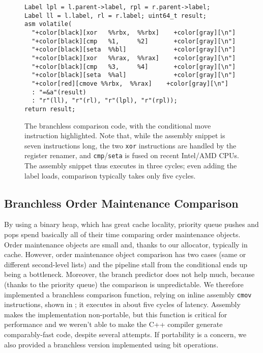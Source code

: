 \begin{figure}
\begin{Verbatim}[formatcom=\color{gray}, commandchars={+[]}]
Label lpl = l.parent->label, rpl = r.parent->label;
Label ll = l.label, rl = r.label; uint64_t result;
asm volatile(
  "+color[black][xor   %%rbx,  %%rbx]    +color[gray][\n"]
  "+color[black][cmp   %1,     %2]       +color[gray][\n"]
  "+color[black][seta  %%bl]             +color[gray][\n"]
  "+color[black][xor   %%rax,  %%rax]    +color[gray][\n"]
  "+color[black][cmp   %3,     %4]       +color[gray][\n"]
  "+color[black][seta  %%al]             +color[gray][\n"]
  "+color[red][cmove %%rbx,  %%rax]    +color[gray][\n"]
  : "=&a"(result)
  : "r"(ll), "r"(rl), "r"(lpl), "r"(rpl));
return result;
\end{Verbatim}
\caption{
  The branchless comparison code,
    with the conditional move instruction highlighted.
  Note that, while the assembly snippet
    is seven instructions long,
    the two \texttt{xor} instructions
    are handled by the register renamer,
    and \texttt{cmp}/\texttt{seta} is fused on recent Intel/AMD CPUs.
  The assembly snippet thus executes in three cycles;
    even adding the label loads,
    comparison typically takes only five cycles.
}
\label{fig:compare}
\end{figure}

\subsection{Branchless Order Maintenance Comparison}

By using a binary heap, which has great cache locality,
priority queue pushes and pops spend basically all of their time
  comparing order maintenance objects.
Order maintenance objects are small and,
  thanks to our allocator, typically in cache.
However, order maintenance object comparison has two cases
  (same or different second-level lists)
  and the pipeline stall from the conditional
  ends up being a bottleneck.
Moreover, the branch predictor does not help much,
  because (thanks to the priority queue)
  the comparison is unpredictable.
We therefore implemented a branchless comparison function,
  relying on inline assembly \texttt{cmov} instructions,
  shown in ;
  it executes in about five cycles of latency.
Assembly makes the implementation non-portable,
  but this function is critical for performance
  and we weren't able to make the C++ compiler
  generate comparably-fast code, despite several attempts.
If portability is a concern, we also provided a branchless version implemented using bit operations.

